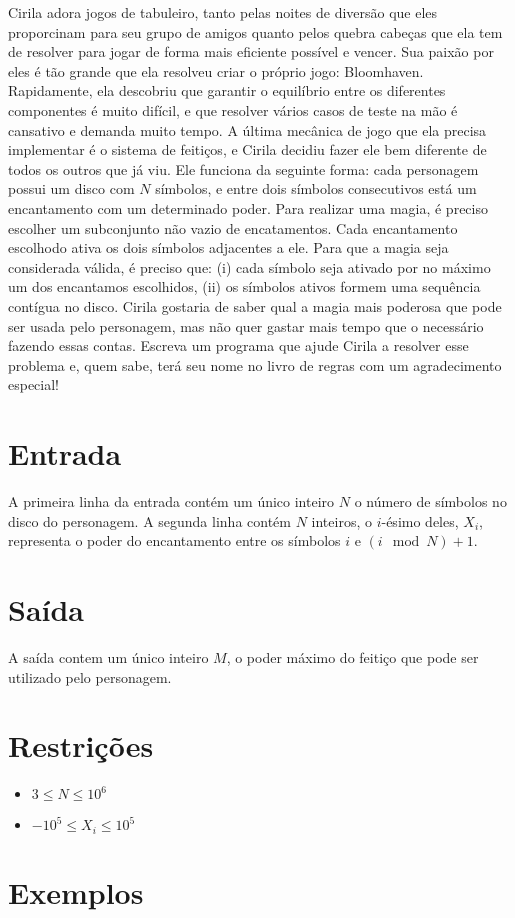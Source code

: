 Cirila adora jogos de tabuleiro, tanto pelas noites de diversão que eles proporcinam para seu grupo de amigos quanto pelos quebra cabeças que ela tem de resolver para jogar de forma mais eficiente possível e vencer.
Sua paixão por eles é tão grande que ela resolveu criar o próprio jogo: Bloomhaven. Rapidamente, ela descobriu que garantir o equilíbrio entre os diferentes componentes é muito difícil, e que resolver vários casos de teste na mão é cansativo e demanda muito tempo.
A última mecânica de jogo que ela precisa implementar é o sistema de feitiços, e Cirila decidiu fazer ele bem diferente de todos os outros que já viu.
Ele funciona da seguinte forma: cada personagem possui um disco com $N$ símbolos, e entre dois símbolos consecutivos está um encantamento com um determinado poder.
Para realizar uma magia, é preciso escolher um subconjunto não vazio de encatamentos. Cada encantamento escolhodo ativa os dois símbolos adjacentes a ele. Para que a magia seja considerada válida, é preciso que: (i) cada símbolo seja ativado por no máximo um dos encantamos escolhidos, (ii) os símbolos ativos formem uma sequência contígua no disco.
Cirila gostaria de saber qual a magia mais poderosa que pode ser usada pelo personagem, mas não quer gastar mais tempo que o necessário fazendo essas contas.
Escreva um programa que ajude Cirila a resolver esse problema e, quem sabe, terá seu nome no livro de regras com um agradecimento especial!

\section*{Entrada}

A primeira linha da entrada contém um único inteiro $N$ o número de símbolos no disco do personagem.
A segunda linha contém $N$ inteiros, o $i$-ésimo deles, $X_i$, representa o poder do encantamento entre os símbolos $i$ e $(i \mod N) + 1$.

\section*{Saída}

A saída contem um único inteiro $M$, o poder máximo do feitiço que pode ser utilizado pelo personagem.

\section*{Restrições}

\begin{itemize}
\item $3 \leq N \leq 10^6$
\item $-10^5 \leq X_i \leq 10^5$
\end{itemize}


\section*{Exemplos}

\exemplo
